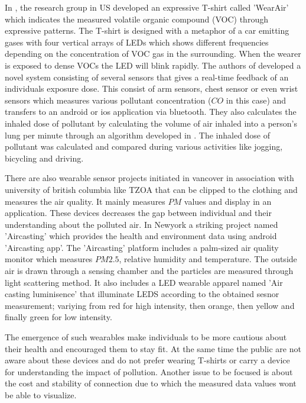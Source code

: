 In \cite{Kim2010}, the research group in US developed an expressive T-shirt called 'WearAir' which indicates the measured volatile organic compound (VOC) through expressive patterns. The T-shirt is designed with a metaphor of a car emitting gases with four vertical arrays of LEDs which shows different frequencies depending on the concentration of VOC gas in the surrounding. When the wearer is exposed to dense VOCs the LED will blink rapidly. 
The authors of \cite{Hu2014} developed a novel system consisting of several sensors that gives a real-time feedback of an individuals exposure dose. This consist of arm sensors, chest sensor or even wrist sensors which measures various pollutant concentration ($CO$ in this case) and transfers to an android or ios application via bluetooth. They also calculates the inhaled dose of pollutant by calculating the volume of air inhaled into a person's lung per minute through an algorithm developed in \cite{Valli2013}. The inhaled dose of pollutant was calculated and compared  during various activities like jogging, bicycling and driving.

 There are also wearable sensor projects initiated in vancover in association with university of british columbia like TZOA \cite{tzoa} that can be clipped to the clothing and measures the air quality. It mainly measures $PM$ values and display in an application. These devices decreases the gap between individual and their understanding about the polluted air. In Newyork a striking project named 'Aircasting'\cite{aircasting} which provides the health and environment data using android 'Aircasting app'. The 'Aircasting'\cite{Han2010} platform includes a palm-sized air quality monitor which measures $PM2.5$, relative humidity and temperature. The outside air is drawn through a sensing chamber and the particles are measured through light scattering method. It also includes a LED wearable apparel named 'Air casting luminisence'\cite{Luminescence} that illuminate LEDS according to the obtained sesnor measurement; variying from red for high intensity, then orange, then yellow and finally green for low intensity. 
 
 The emergence of such wearables make individuals to be more cautious about their health and encouraged them to stay fit. At the same time the public are not aware about these devices and do not prefer wearing T-shirts or carry a device for understanding the impact of pollution. Another issue to be focused is about the cost and stability of  connection due to which the measured data values wont be able to visualize.




